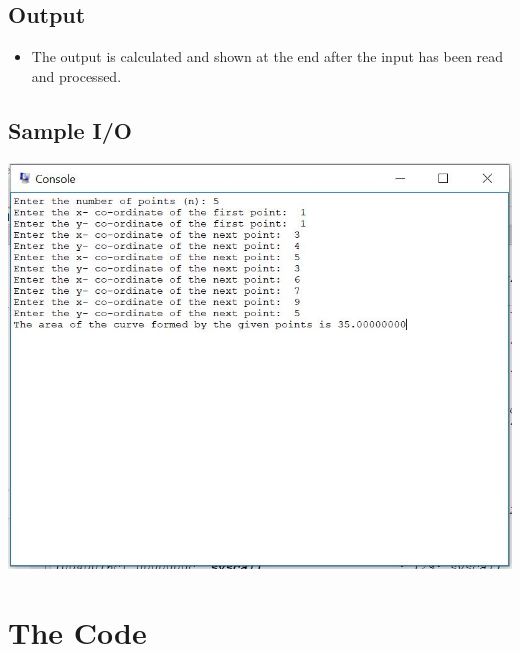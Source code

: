 \documentclass{article} %
\begin{document}
\subsection{Output}
\begin{itemize}
    \item The output is calculated and shown at the end after the input has been read and processed.
\end{itemize}
\subsection{Sample I/O}
\includegraphics{sampleio_A1.JPG}

\section{The Code}
\end{document}

